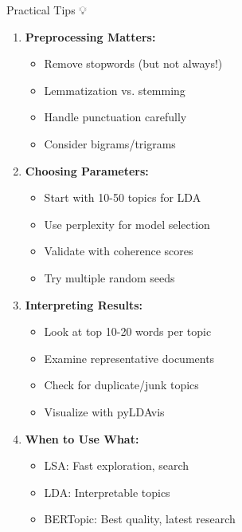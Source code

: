 \documentclass[aspectratio=169]{beamer}
\begin{document}
\begin{frame}[shrink=10]{Practical Tips 💡}
\begin{enumerate}\setlength{\itemsep}{0pt}
    \item \textbf{Preprocessing Matters:}
    \begin{itemize}\setlength{\itemsep}{0pt}
        \item Remove stopwords (but not always!)
        \item Lemmatization vs. stemming
        \item Handle punctuation carefully
        \item Consider bigrams/trigrams
    \end{itemize}

    \item \textbf{Choosing Parameters:}
    \begin{itemize}\setlength{\itemsep}{0pt}
        \item Start with 10-50 topics for LDA
        \item Use perplexity for model selection
        \item Validate with coherence scores
        \item Try multiple random seeds
    \end{itemize}

    \item \textbf{Interpreting Results:}
    \begin{itemize}\setlength{\itemsep}{0pt}
        \item Look at top 10-20 words per topic
        \item Examine representative documents
        \item Check for duplicate/junk topics
        \item Visualize with pyLDAvis
    \end{itemize}

    \item \textbf{When to Use What:}
    \begin{itemize}\setlength{\itemsep}{0pt}
        \item LSA: Fast exploration, search
        \item LDA: Interpretable topics
        \item BERTopic: Best quality, latest research
    \end{itemize}
\end{enumerate}
\end{frame}
\end{document}
